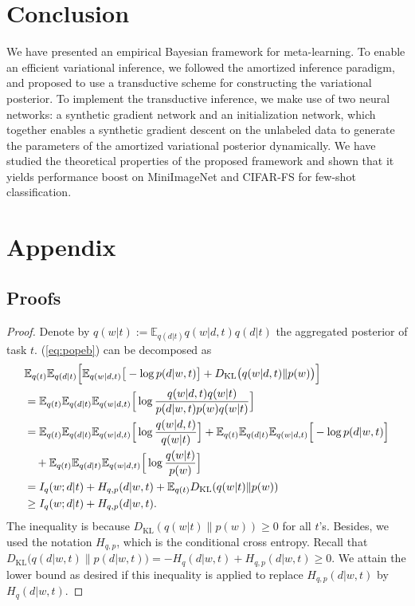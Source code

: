 \documentclass{article} \usepackage{iclr2020_conference,times}
\def\eqref#1{(\ref{#1})}
\newcommand{\E}{\mathbb{E}}
\begin{document}
 

\section{Conclusion}

We have presented an empirical Bayesian framework for meta-learning. 
To enable an efficient variational inference, we followed the amortized inference paradigm,
and proposed to use a transductive scheme for constructing the variational posterior.
To implement the transductive inference, we make use of two neural networks:
a synthetic gradient network and an initialization network,
which together enables a synthetic gradient descent on the unlabeled data 
to generate the parameters of the amortized variational posterior dynamically.
We have studied the theoretical properties of the proposed framework 
and shown that it yields performance boost on MiniImageNet and CIFAR-FS for few-shot classification.









\appendix
\section*{Appendix}
\renewcommand{\thesubsection}{\Alph{subsection}}

\subsection{Proofs}

\ebibt
\begin{proof}
    Denote by $q(w | t) := \E_{q(d|t)} q(w | d, t) q(d | t)$ the aggregated posterior of task $t$.
    \eqref{eq:popeb} can be decomposed as
\begin{align}
    &\E_{q(t)} \E_{q(d|t)} \Big[ 
        \E_{q(w|d,t)} \big[ -\log p(d | w, t) \big] + D_\text{KL}\big(q(w | d, t) \| p(w) \big)
    \Big] \\ 
    &= \E_{q(t)} \E_{q(d|t)} \E_{q(w|d,t)} \Big[ \log \frac{q(w | d, t)q(w | t)}{p(d | w, t) p(w) q(w | t)} \Big] \\
    &= \E_{q(t)} \E_{q(d|t)} \E_{q(w|d,t)} \Big[ \log \frac{q(w | d, t)}{q(w | t)} \Big] 
    + \E_{q(t)} \E_{q(d|t)} \E_{q(w|d,t)} \Big[ -\log p(d | w, t) \Big] \notag \\
    &\quad + \E_{q(t)} \E_{q(d|t)} \E_{q(w|d,t)} \Big[ \log \frac{q(w | t)}{p(w)} \Big] \\
    &= I_q(w; d | t) + H_{q,p}(d | w, t) + \E_{q(t)} D_\text{KL}(q(w|t) \| p(w)) \\
    &\geq I_q(w; d | t) + H_{q,p}(d | w, t) \label{eq:ibt}.
\end{align}
    The inequality is because $D_\text{KL}(q(w|t) \| p(w)) \geq 0$ for all $t$'s.
    Besides, we used the notation $H_{q,p}$, which is the conditional cross entropy. Recall that $D_\text{KL}\big(q(d | w, t) \| p(d | w, t) \big) = -H_q(d | w, t) + H_{q,p}(d | w, t) \geq 0$.
    We attain the lower bound as desired if this inequality is applied to replace $H_{q,p}(d | w, t)$ by $H_q(d | w, t)$.
\end{proof}
\end{document}
